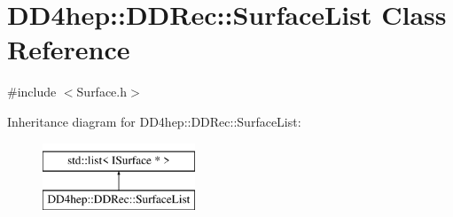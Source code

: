 \hypertarget{class_d_d4hep_1_1_d_d_rec_1_1_surface_list}{}\section{D\+D4hep\+:\+:D\+D\+Rec\+:\+:Surface\+List Class Reference}
\label{class_d_d4hep_1_1_d_d_rec_1_1_surface_list}


{\ttfamily \#include $<$Surface.\+h$>$}

Inheritance diagram for D\+D4hep\+:\+:D\+D\+Rec\+:\+:Surface\+List\+:\begin{figure}[H]
\begin{center}
\leavevmode
\includegraphics[height=2.000000cm]{class_d_d4hep_1_1_d_d_rec_1_1_surface_list}
\end{center}
\end{figure}
